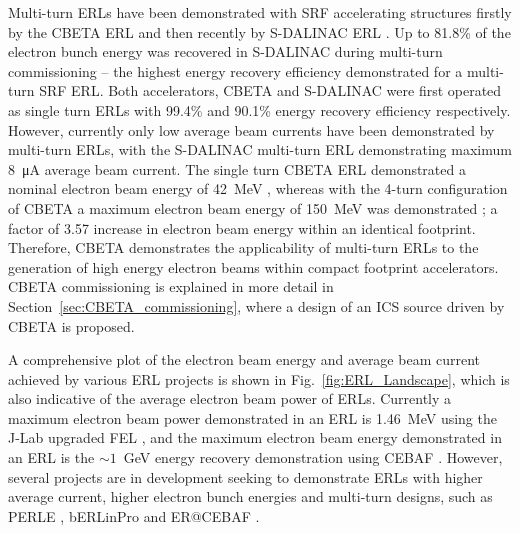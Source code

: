\documentclass[../main.tex]{subfiles}
\begin{document}
Multi-turn ERLs have been demonstrated with SRF accelerating structures firstly by the CBETA ERL \cite{bartnik2020cbeta} and then recently by S-DALINAC ERL \cite{adolphsen2022european}. Up to 81.8\% of the electron bunch energy was recovered in S-DALINAC during multi-turn commissioning -- the highest energy recovery efficiency demonstrated for a multi-turn SRF ERL. Both accelerators, CBETA \cite{gulliford2021measurement} and S-DALINAC
\cite{steinhorst2021rf} were first operated as single turn ERLs with 99.4\% and 90.1\% energy recovery efficiency respectively. However, currently only low average beam currents have been demonstrated by multi-turn ERLs, with the S-DALINAC multi-turn ERL demonstrating maximum 8~\si{\micro\ampere} average beam current. The single turn CBETA ERL demonstrated a nominal electron beam energy of 42~\si{\mega\electronvolt} \cite{gulliford2021measurement}, whereas with the 4-turn configuration of CBETA a maximum electron beam energy of 150~\si{\mega\electronvolt} was demonstrated \cite{bartnik2020cbeta}; a factor of 3.57 increase in electron beam energy within an identical footprint. Therefore, CBETA demonstrates the applicability of multi-turn ERLs to the generation of high energy electron beams within compact footprint accelerators. CBETA commissioning is explained in more detail in Section~\ref{sec:CBETA_commissioning}, where a design of an ICS source driven by CBETA is proposed.

A comprehensive plot of the electron beam energy and average beam current achieved by various ERL projects is shown in Fig.~\ref{fig:ERL_Landscape}, which is also indicative of the average electron beam power of ERLs. Currently a maximum electron beam power demonstrated in an ERL is 1.46~\si{\mega\electronvolt} using the J-Lab upgraded FEL \cite{neil2006jlab}, and the maximum electron beam energy demonstrated in an ERL is the $\sim1$~\si{\giga\electronvolt} energy recovery demonstration using CEBAF \cite{bogacz2003cebaf,tennant2003beam}. However, several projects are in development seeking to demonstrate ERLs with higher average current, higher electron bunch energies and multi-turn designs, such as PERLE \cite{angal2018perle}, bERLinPro \cite{kuske2012conceptual} and ER@CEBAF \cite{meot2016er}.
\end{document}
